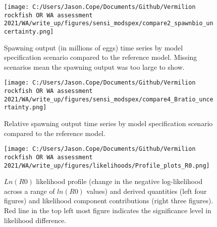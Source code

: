 \documentclass[11pt,
  english,
  a4paper,
]{article}
\begin{document}
\tagmcend\tagstructend


\begin{figure}
\centering
\texttt{[image: C:/Users/Jason.Cope/Documents/Github/Vermilion rockfish OR WA assessment 2021/WA/write\_up/figures/sensi\_modspex/compare2\_spawnbio\_uncertainty.png]}
\caption{Spawning output (in millions of eggs) time series by model specification scenario compared to the reference model. Missing scenarios mean the spawning output was too large to show.\label{fig:sensi-modspec-ssb}}
\end{figure}

\tagmcend\tagstructend


\begin{figure}
\centering
\texttt{[image: C:/Users/Jason.Cope/Documents/Github/Vermilion rockfish OR WA assessment 2021/WA/write\_up/figures/sensi\_modspex/compare4\_Bratio\_uncertainty.png]}
\caption{Relative spawning output time series by model specification scenario compared to the reference model.\label{fig:sensi-modspec-depl}}
\end{figure}

\tagmcend\tagstructend


\begin{figure}
\centering
\texttt{[image: C:/Users/Jason.Cope/Documents/Github/Vermilion rockfish OR WA assessment 2021/WA/write\_up/figures/likelihoods/Profile\_plots\_R0.png]}
\caption{{\(Ln(R0)\)\leavevmode\tagmcend\tagstructend} likelihood profile (change in the negative log-likelihood across a range of {\(ln(R0)\)\leavevmode\tagmcend\tagstructend} values) and derived quantities (left four figures) and likelihood component contributions (right three figures). Red line in the top left most figure indicates the significance level in likelihood difference.\label{fig:r0-profile-combo}}
\end{figure}
\end{document}
